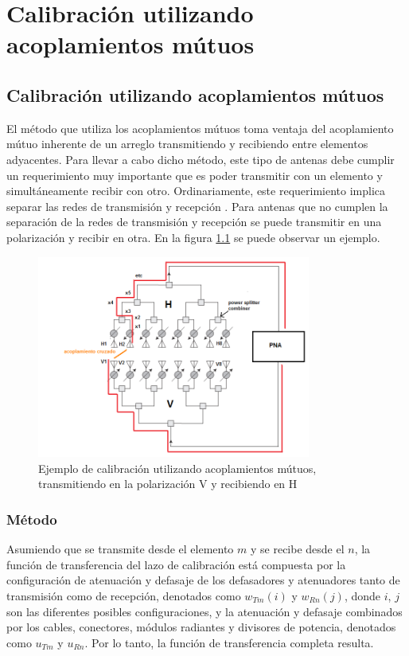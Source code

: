 \chapter{Calibración utilizando acoplamientos mútuos}
\label{ch:convertidores}

\section{Calibración utilizando acoplamientos mútuos}

El método que utiliza los acoplamientos mútuos toma ventaja del acoplamiento mútuo inherente de un arreglo transmitiendo 
y recibiendo entre elementos adyacentes. Para llevar a cabo dicho método, este tipo de antenas debe cumplir un 
requerimiento muy importante que es poder transmitir con un elemento y simultáneamente recibir con otro. 
Ordinariamente, este requerimiento implica separar las redes de transmisión y recepción \cite{Gao2001}. Para antenas que no 
cumplen la separación de la redes de transmisión y recepción se puede transmitir en una polarización y recibir en otra. 
En la figura \ref{fig:mutual_general} se puede observar un ejemplo.

\begin{figure}[H]
 \centering
 \includegraphics[width=9cm]{gfx/mutualCouplingExample.png}
 \caption{Ejemplo de calibración utilizando acoplamientos mútuos, transmitiendo en la polarización V y recibiendo en H}
 \label{fig:mutual_general}
\end{figure}

\subsection{Método}

Asumiendo que se transmite desde el elemento $m$ y se recibe desde el $n$, la función de transferencia del lazo de 
calibración está compuesta por la configuración de atenuación y defasaje de los defasadores y atenuadores tanto de 
transmisión como de recepción, denotados como $w_{Tm}(i)$ y $w_{Rn}(j)$, donde $i$, $j$ son las diferentes posibles 
configuraciones, y la atenuación y defasaje combinados por los cables, conectores, módulos radiantes y divisores de potencia,
denotados como $u_{Tm}$ y $u_{Rn}$. Por lo tanto, la función de transferencia completa resulta.

